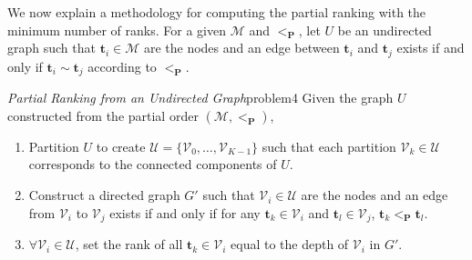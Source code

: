 \documentclass[acmsmall,screen, review]{acmart}
\newcommand{\acc}[1]{{\color{red}#1}}
\begin{document}

We now explain a methodology for computing the partial ranking with the minimum number of ranks. For a given $\mathcal{M}$ and $<_{\mathbf{P}}$, let $U$ be an undirected graph such that $\mathbf{t}_i \in \mathcal{M}$ are the nodes and an edge between $\mathbf{t}_i$ and $\mathbf{t}_j$ exists if and only if $\mathbf{t}_i \sim \mathbf{t}_j$ according to $<_{\mathbf{P}}$.

\begin{mytheo}{\textit{Partial Ranking from an Undirected Graph}}{problem4}
	Given the graph $U$ constructed from the partial order $(\mathcal{M}, <_{\mathbf{P}})$,
	\begin{enumerate}
		\item Partition $U$ to create $\mathcal{U} = \{\mathcal{V}_0, \dots, \mathcal{V}_{K-1}\}$ such that each partition $\mathcal{V}_k \in \mathcal{U}$ corresponds to the connected components of $U$. 
		\item Construct a directed graph $G'$ such that $\mathcal{V}_i \in \mathcal{U}$ are the nodes and an edge from $\mathcal{V}_i$ to $\mathcal{V}_j$ exists if and only if for any $\mathbf{t}_k \in \mathcal{V}_i$ and  $\mathbf{t}_l \in \mathcal{V}_j$, $\mathbf{t}_k <_{\mathbf{P}} \mathbf{t}_l$. 
		\item $\forall \mathcal{V}_i \in \mathcal{U}$, set the rank of all $\mathbf{t}_k \in \mathcal{V}_i$ equal to the depth of $\mathcal{V}_i$ in $G'$.
	\end{enumerate}
\end{mytheo}

\end{document}
